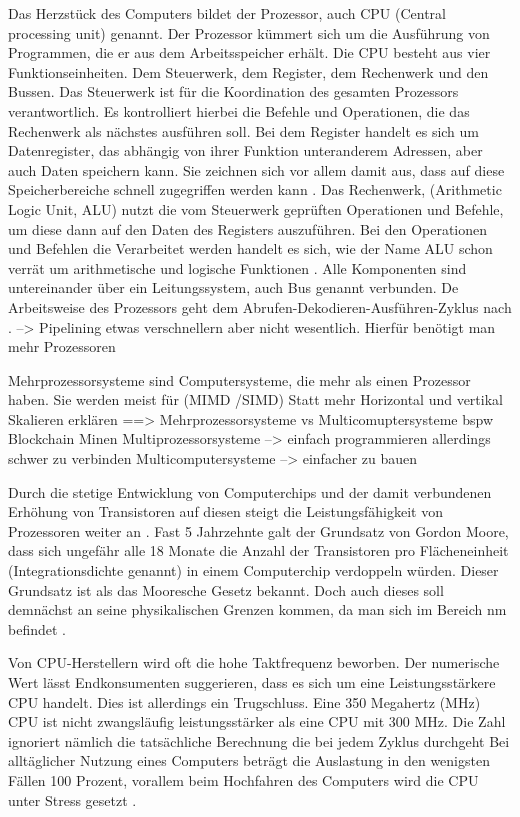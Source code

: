 Das Herzstück des Computers bildet der Prozessor, auch CPU (Central processing unit) genannt. Der Prozessor kümmert sich um die Ausführung von Programmen, die er aus dem Arbeitsspeicher erhält. 
Die CPU besteht aus vier Funktionseinheiten. Dem Steuerwerk, dem Register, dem Rechenwerk und den Bussen.
Das Steuerwerk ist für die Koordination des gesamten Prozessors verantwortlich. Es kontrolliert hierbei die Befehle und Operationen, die das Rechenwerk als nächstes ausführen soll. 
Bei dem Register handelt es sich um Datenregister, das abhängig von ihrer Funktion unteranderem Adressen, aber auch Daten speichern kann. Sie zeichnen sich vor allem damit aus, dass auf diese Speicherbereiche schnell zugegriffen werden kann \cite{tanenbaum}. 
Das Rechenwerk, (Arithmetic Logic Unit, ALU) nutzt die vom Steuerwerk geprüften Operationen und Befehle, um diese dann auf den Daten des Registers auszuführen. Bei den Operationen und Befehlen die Verarbeitet werden handelt es sich, wie der Name ALU schon verrät um arithmetische und logische Funktionen \cite{tanenbaum}. 
Alle Komponenten sind untereinander über ein Leitungssystem, auch Bus genannt verbunden. 
De Arbeitsweise des Prozessors geht dem Abrufen-Dekodieren-Ausführen-Zyklus nach \cite{tanenbaum}.   
--> Pipelining etwas verschnellern aber nicht wesentlich. Hierfür benötigt man mehr Prozessoren

Mehrprozessorsysteme sind Computersysteme, die mehr als einen Prozessor haben. Sie werden meist für
(MIMD /SIMD)
Statt mehr 
Horizontal und vertikal Skalieren erklären ==> Mehrprozessorsysteme vs Multicomuptersysteme
bspw Blockchain Minen
Multiprozessorsysteme --> einfach programmieren allerdings schwer zu verbinden \cite{tanenbaum} 
Multicomputersysteme --> einfacher zu bauen \cite{tanenbaum}



Durch die stetige Entwicklung von Computerchips und der damit verbundenen Erhöhung von Transistoren auf diesen steigt die Leistungsfähigkeit von Prozessoren weiter an \cite{tanenbaum}.
Fast 5 Jahrzehnte galt der Grundsatz von Gordon Moore, dass sich ungefähr alle 18 Monate die Anzahl der Transistoren pro Flächeneinheit (Integrationsdichte genannt) in einem Computerchip verdoppeln würden. Dieser Grundsatz ist als das Mooresche Gesetz bekannt. Doch auch dieses soll demnächst an seine physikalischen Grenzen kommen, da man sich im Bereich nm 
befindet \cite{theis2017}. 

Von CPU-Herstellern wird oft die hohe Taktfrequenz beworben. Der numerische Wert lässt Endkonsumenten suggerieren, dass es sich um eine Leistungsstärkere CPU handelt. Dies ist allerdings ein Trugschluss. Eine 350 Megahertz (MHz) CPU ist nicht zwangsläufig leistungsstärker als eine CPU mit 300 MHz. Die Zahl ignoriert nämlich die tatsächliche Berechnung die bei jedem Zyklus durchgeht \cite{djl2005} 
Bei alltäglicher Nutzung eines Computers beträgt die Auslastung in den wenigsten Fällen 100 Prozent, vorallem beim Hochfahren des Computers wird die CPU unter Stress gesetzt \cite{singh2016}.

